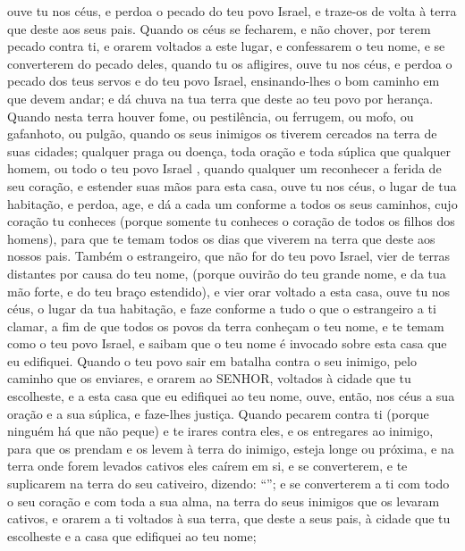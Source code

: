 {{  ouve tu nos céus, e perdoa o pecado do teu povo Israel, e traze-os de volta à terra que deste aos seus pais.
  Quando os céus se fecharem, e não chover, por terem pecado contra ti, e orarem voltados a este lugar, e confessarem o teu nome, e se converterem do pecado deles, quando tu os afligires,
  ouve tu nos céus, e perdoa o pecado dos teus servos e do teu povo Israel, ensinando-lhes o bom caminho em que devem andar; e dá chuva na tua terra que deste ao teu povo por herança.
  Quando nesta terra houver fome, ou pestilência, ou ferrugem, ou mofo, ou gafanhoto, ou pulgão, quando os seus inimigos os tiverem cercados na terra de suas cidades; qualquer praga ou doença, %
  toda oração e toda súplica que qualquer homem, ou todo o teu povo Israel {}, quando qualquer um reconhecer a ferida de seu coração, e estender suas mãos para esta casa,
  ouve tu nos céus, o lugar de tua habitação, e perdoa, age, e dá a cada um conforme a todos os seus caminhos, cujo coração tu conheces (porque somente tu conheces o coração de todos os filhos dos homens),
  para que te temam todos os dias que viverem na terra que deste aos nossos pais.
  Também o estrangeiro, que não for do teu povo Israel, vier de terras distantes por causa do teu nome,
  (porque ouvirão do teu grande nome, e da tua mão forte, e do teu braço estendido), e vier orar voltado a esta casa,
  ouve tu nos céus, o lugar da tua habitação, e faze conforme a tudo o que o estrangeiro a ti clamar, a fim de que todos os povos da terra conheçam o teu nome, e te temam como o teu povo Israel, e saibam que o teu nome é invocado sobre esta casa que eu edifiquei.
  Quando o teu povo sair em batalha contra o seu inimigo, pelo caminho que os enviares, e orarem ao SENHOR, voltados à cidade que tu escolheste, e a esta casa que eu edifiquei ao teu nome,
  ouve, então, nos céus a sua oração e a sua súplica, e faze-lhes justiça.
  Quando pecarem contra ti (porque ninguém há que não peque) e te irares contra eles, e os entregares ao inimigo, para que os prendam e os levem à terra do inimigo, esteja longe ou próxima,
  e na terra onde forem levados cativos eles caírem em si, e se converterem, e te suplicarem na terra do seu cativeiro, dizendo: \enquote{};
  e se converterem a ti com todo o seu coração e com toda a sua alma, na terra do seus inimigos que os levaram cativos, e orarem a ti voltados à sua terra, que deste a seus pais, à cidade que tu escolheste e a casa que edifiquei ao teu nome;
}}
